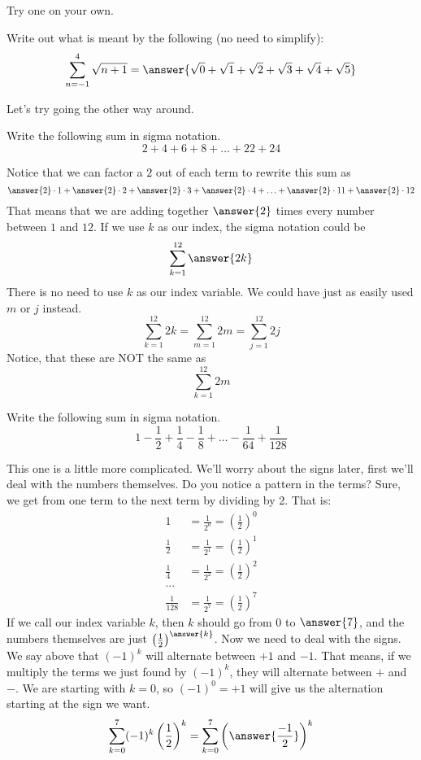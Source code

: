 \documentclass[12pt]{ximera}
\theoremstyle{definition}
\newcommand{\hop}{\vskip 0.18in}
\begin{document}
Try one on your own.
\begin{question}
	Write out what is meant by the following (no need to simplify):
	\[ \sum_{n=-1}^{4} \sqrt{n+1} =\answer{\sqrt{0}+\sqrt{1}+\sqrt{2}+\sqrt{3}+\sqrt{4}+\sqrt{5}}\]
\end{question}
\hop

Let's try going the other way around.
\begin{example}
	Write the following sum in sigma notation.
	\[ 2 + 4 + 6 + 8 + \ldots + 22 + 24 \]
	\begin{explanation}
		Notice that we can factor a $2$ out of each term to rewrite this sum as
		\[ \answer{2}\cdot 1 + \answer{2} \cdot 2 + \answer{2}\cdot 3 + \answer{2} \cdot 4 + \ldots + \answer{2}\cdot 11 + \answer{2}\cdot 12 \]
		That means that we are adding together $\answer{2}$ times every number between $1$ and $12$.  If we use $k$ as our index, the sigma notation could be
		\[ \sum_{k=1}^{12} \answer{2k} \]
		There is no need to use $k$ as our index variable.  We could have just as easily used $m$ or $j$ instead.
		\[ \sum_{k=1}^{12} 2k = \sum_{m=1}^{12} 2m = \sum_{j=1}^{12} 2j\]  
		Notice, that these are NOT the same as
		\[ \sum_{k=1}^{12} 2m \]
	\end{explanation}
\end{example}
\hop

\begin{example}
	Write the following sum in sigma notation.
	\[ 1 - \frac{1}{2} + \frac{1}{4} - \frac{1}{8} + \ldots - \frac{1}{64} + \frac{1}{128}  \]
	\begin{explanation}
		This one is a little more complicated.  We'll worry about the signs later, first we'll deal with the numbers themselves.  Do you notice a pattern in the terms?
		Sure, we get from one term to the next term by dividing by 2.  That is:
		\begin{align*}
			1 &= \frac{1}{2^0} = \left(\frac{1}{2}\right)^0\\
			\frac{1}{2} &= \frac{1}{2^1} = \left(\frac{1}{2}\right)^{1}\\
			\frac{1}{4} &= \frac{1}{2^2} = \left(\frac{1}{2}\right)^{2}\\
				 ...  \\
			 \frac{1}{128} &= \frac{1}{2^7} = \left(\frac{1}{2}\right)^{7}
		\end{align*}
		If we call our index variable $k$, then $k$ should go from $0$ to $\answer{7}$, and the numbers themselves are just $\left(\frac{1}{2}\right)^{\answer{k}}$.  Now we need to deal with the signs.
		We say above that $(-1)^k$ will alternate between $+1$ and $-1$.  That means, if we multiply the terms we just found by $(-1)^k$, they will alternate between $+$ and $-$.  
		We are starting with $k=0$, so $(-1)^0 = +1$ will give us the alternation starting at the sign we want.
		\[ \sum_{k=0}^{7} (-1)^k \left(\frac{1}{2}\right)^{k} = \sum_{k=0}^7 \left( \answer{\frac{-1}{2}} \right)^k \]
	\end{explanation}
\end{example}
 \hop
 
\end{document}
